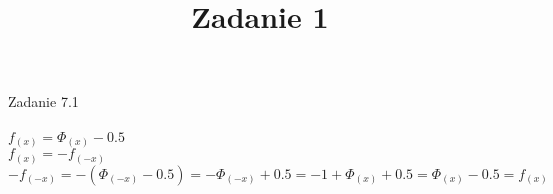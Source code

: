\documentclass[11pt,a4paper]{article}
\title{Zadanie 1}
\begin{document}
	Zadanie 7.1
\\\\
$f_{(x)} = \Phi_{(x)} - 0.5$\\
$f_{(x)} = -f_{(-x)}$\\
$-f_{(-x)} = -(\Phi_{(-x)} - 0.5) = -\Phi_{(-x)} + 0.5 = -1 +\Phi_{(x)} + 0.5 = \Phi_{(x)} - 0.5 = f_{(x)}$
\end{document}
